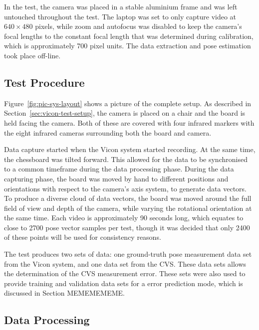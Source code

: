 In the test, the camera was placed in a stable aluminium frame and was left untouched throughout the test. The laptop was set to only capture video at $640\times480$ pixels, while zoom and autofocus was disabled to keep the camera's focal lengths to the constant focal length that was determined during calibration, which is approximately 700 pixel units. The data extraction and pose estimation took place off-line. 

\subsection{Test Procedure}

Figure~\ref{fig:pic-sys-layout} shows a picture of the complete setup. As described in Section~\ref{sec:vicon-test-setup}, the camera is placed on a chair and the board is held facing the camera. Both of these are covered with four infrared markers with the eight infrared cameras surrounding both the board and camera.  


Data capture started when the Vicon system started recording. At the same time, the chessboard was tilted forward. This allowed for the data to be synchronised to a common timeframe during the data processing phase. During the data capturing phase, the board was moved by hand to different positions and orientations with respect to the camera's axis system, to generate data vectors. To produce a diverse cloud of data vectors, the board was moved around the full field of view and depth of the camera, while varying the rotational orientation at the same time. Each video is approximately 90 seconds long, which equates to close to 2700 pose vector samples per test, though it was decided that only 2400 of these points will be used for consistency reasons. 

The test produces two sets of data: one ground-truth pose measurement data set from the Vicon system, and one data set from the CVS\@. These data sets allows the determination of the CVS measurement error. These sets were also used to provide training and validation data sets for a error prediction mode, which is discussed in Section MEMEMEMEME.\@

\subsection{Data Processing}

